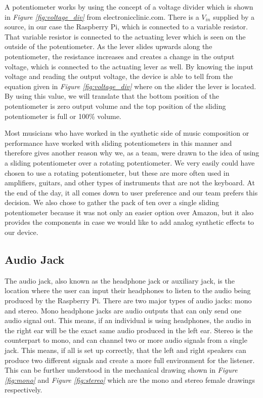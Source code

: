 A potentiometer works by using the concept of a voltage divider which is shown in \textit{Figure \ref{fig:voltage_div}} from electronicclinic.com. There is a $ V_{in} $ supplied by a source, in our case the Raspberry Pi, which is connected to a variable resistor. That variable resistor is connected to the actuating lever which is seen on the outside of the potentiometer. As the lever slides upwards along the potentiometer, the resistance increases and creates a change in the output voltage, which is connected to the actuating lever as well. By knowing the input voltage and reading the output voltage, the device is able to tell from the equation given in \textit{Figure \ref{fig:voltage_div}} where on the slider the lever is located. By using this value, we will translate that the bottom position of the potentiometer is zero output volume and the top position of the sliding potentiometer is full or 100\% volume.

Most musicians who have worked in the synthetic side of music composition or performance have worked with sliding potentiometers in this manner and therefore gives another reason why we, as a team, were drawn to the idea of using a sliding potentiometer over a rotating potentiometer. We very easily could have chosen to use a rotating potentiometer, but these are more often used in amplifiers, guitars, and other types of instruments that are not the keyboard. At the end of the day, it all comes down to user preference and our team prefers this decision. We also chose to gather the pack of ten over a single sliding potentiometer because it was not only an easier option over Amazon, but it also provides the components in case we would like to add analog synthetic effects to our device.

\subsection{Audio Jack}

The audio jack, also known as the headphone jack or auxiliary jack, is the location where the user can input their headphones to listen to the audio being produced by the Raspberry Pi. There are two major types of audio jacks: mono and stereo. Mono headphone jacks are audio outputs that can only send one audio signal out. This means, if an individual is using headphones, the audio in the right ear will be the exact same audio produced in the left ear. Stereo is the counterpart to mono, and can channel two or more audio signals from a single jack. This means, if all is set up correctly, that the left and right speakers can produce two different signals and create a more full environment for the listener. This can be further understood in the mechanical drawing shown in \textit{Figure \ref{fig:mono}} and \textit{Figure \ref{fig:stereo}} which are the mono and stereo female drawings respectively.

